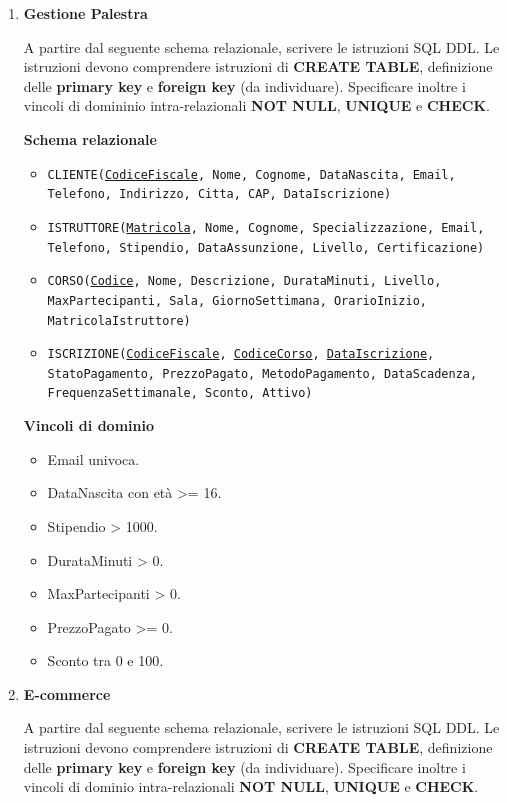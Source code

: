 \documentclass[a4paper,12pt]{article}
\begin{document}
\begin{enumerate}

\item \textbf{Gestione Palestra}

A partire dal seguente schema relazionale, scrivere le istruzioni SQL DDL.
Le istruzioni devono comprendere istruzioni di \textbf{CREATE TABLE}, definizione delle \textbf{primary key} e \textbf{foreign key} (da individuare). Specificare inoltre i vincoli di domininio intra-relazionali \textbf{NOT NULL}, \textbf{UNIQUE} e \textbf{CHECK}.

\textbf{Schema relazionale}
\begin{itemize}
    \item \texttt{CLIENTE(\underline{CodiceFiscale}, Nome, Cognome, DataNascita, Email, Telefono, Indirizzo, Citta, CAP, DataIscrizione)}
    \item \texttt{ISTRUTTORE(\underline{Matricola}, Nome, Cognome, Specializzazione, Email, Telefono, Stipendio, DataAssunzione, Livello, Certificazione)}
    \item \texttt{CORSO(\underline{Codice}, Nome, Descrizione, DurataMinuti, Livello, MaxPartecipanti, Sala, GiornoSettimana, OrarioInizio, MatricolaIstruttore)}
    \item \texttt{ISCRIZIONE(\underline{CodiceFiscale}, \underline{CodiceCorso}, \underline{DataIscrizione}, StatoPagamento, PrezzoPagato, MetodoPagamento, DataScadenza, FrequenzaSettimanale, Sconto, Attivo)}
\end{itemize}

\textbf{Vincoli di dominio}
\begin{itemize}
\item Email univoca.
\item DataNascita con età >= 16.
\item Stipendio > 1000.
\item DurataMinuti > 0.
\item MaxPartecipanti > 0.
\item PrezzoPagato >= 0.
\item Sconto tra 0 e 100.
\end{itemize}
\newpage



\item \textbf{E-commerce}

A partire dal seguente schema relazionale, scrivere le istruzioni SQL DDL.
Le istruzioni devono comprendere istruzioni di \textbf{CREATE TABLE}, definizione delle \textbf{primary key} e \textbf{foreign key} (da individuare). Specificare inoltre i vincoli di dominio intra-relazionali \textbf{NOT NULL}, \textbf{UNIQUE} e \textbf{CHECK}.


\end{enumerate}
\end{document}
